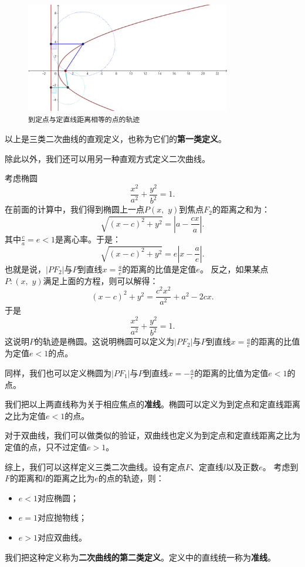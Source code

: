 \documentclass[12pt,UTF8]{ctexbook}
\theoremstyle{definition}
\theoremstyle{plain}
\begin{document}
\begin{figure}[h] 
    \centering
    \includegraphics[width=0.8\textwidth]{tu/抛物线第一定义.png}
    \caption*{\texttt{到定点与定直线距离相等的点的轨迹}}
\end{figure}

以上是三类二次曲线的直观定义，也称为它们的\textbf{第一类定义}。

除此以外，我们还可以用另一种直观方式定义二次曲线。

考虑椭圆
$$ \frac{x^2}{a^2} + \frac{y^2}{b^2} = 1.$$
在前面的计算中，我们得到椭圆上一点$P(x,\,\,y)$到焦点$F_2$的距离之和为：
$$ \sqrt{(x - c)^2 + y^2} = \left|a - \frac{cx}{a}\right|.$$
其中$\frac{c}{a} = e < 1$是离心率。于是：
$$  \sqrt{(x - c)^2 + y^2} = e\left|x - \frac{a}{e}\right| . $$
也就是说，$|PF_2|$与$P$到直线$x = \frac{a}{e}$的距离的比值是定值$e$。
反之，如果某点$P:(x,\,\,y)$满足上面的方程，则可以解得：
$$ (x - c)^2 + y^2 = \frac{c^2x^2}{a^2} + a^2 -2cx.$$
于是
$$ \frac{x^2}{a^2} + \frac{y^2}{b^2} = 1.$$
这说明$P$的轨迹是椭圆。这说明椭圆可以定义为$|PF_2|$与$P$到直线$x = \frac{a}{e}$的距离的比值为定值$e<1$的点。

同样，我们也可以定义椭圆为$|PF_1|$与$P$到直线$x = -\frac{a}{e}$的距离的比值为定值$e<1$的点。

我们把以上两直线称为关于相应焦点的\textbf{准线}。椭圆可以定义为到定点和定直线距离之比为定值$e<1$的点。

对于双曲线，我们可以做类似的验证，双曲线也定义为到定点和定直线距离之比为定值的点，只不过定值$e > 1$。

综上，我们可以这样定义三类二次曲线。设有定点$F$、定直线$l$以及正数$e$。
考虑到$F$的距离和$l$的距离之比为$e$的点的轨迹，则：
\begin{itemize}
    \item $e<1$对应椭圆；
    \item $e = 1$对应抛物线；
    \item $e >1$对应双曲线。
\end{itemize}
我们把这种定义称为\textbf{二次曲线的第二类定义}。定义中的直线统一称为\textbf{准线}。
\end{document}
